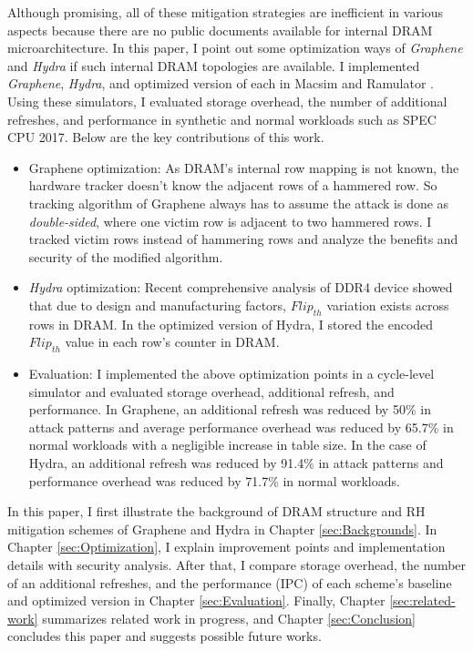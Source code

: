 Although promising, all of these mitigation strategies are inefficient in various aspects because there 
are no public documents available for internal DRAM microarchitecture. In this paper, I point out some 
optimization ways of \textit{Graphene} and \textit{Hydra} if such internal DRAM topologies are available. 
I implemented \textit{Graphene}, \textit{Hydra}, and optimized version of each in Macsim \cite{MACSIM} and 
Ramulator \cite{RAMULATOR}. Using these simulators, I evaluated storage overhead, the number of additional refreshes, and 
performance in synthetic and normal workloads such as SPEC CPU 2017. Below are the key contributions of this work.
\begin{itemize}
  \item Graphene optimization: As DRAM's internal row mapping is not known, 
  the hardware tracker doesn't know the adjacent rows of a hammered row. So tracking algorithm of 
  Graphene always has to assume the attack is done as \textit{double-sided}, where one victim row is adjacent to two hammered rows. 
  I tracked victim rows instead of hammering rows and analyze the benefits and security of the modified algorithm.
  \item \textit{Hydra} optimization: Recent comprehensive analysis of DDR4 device showed that due to design and manufacturing factors, 
  $Flip_{th}$ variation exists across rows in DRAM. In the optimized version of  Hydra, 
  I stored the encoded $Flip_{th}$ value in each row's counter in DRAM.
  \item Evaluation: I implemented the above optimization points in a cycle-level  
  simulator and evaluated storage overhead, additional refresh, and performance. 
  In Graphene, an additional refresh was reduced by 50\% in attack patterns and average performance overhead was reduced by 65.7\%
  in normal workloads with a negligible increase in table size. In the case of Hydra, an additional refresh was reduced by 91.4\% in attack patterns and performance overhead was reduced by 71.7\% in normal workloads.
\end{itemize}

In this paper, I first illustrate the background of DRAM structure and RH mitigation 
schemes of Graphene and Hydra in Chapter \ref{sec:Backgrounds}. In Chapter \ref{sec:Optimization}, 
I explain improvement points and implementation details with security analysis. After that, I compare storage overhead, 
the number of an additional refreshes, and the performance (IPC) of each scheme's baseline and optimized version 
in Chapter \ref{sec:Evaluation}. Finally, Chapter \ref{sec:related-work} summarizes related work in progress, and
Chapter \ref{sec:Conclusion} concludes this paper and suggests possible future works.

